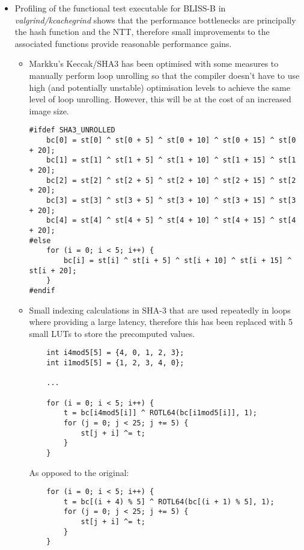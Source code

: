 \begin{itemize}
\item Profiling of the functional test executable for BLISS-B in \textit{valgrind/kcachegrind} shows that the performance bottlenecks are principally the hash function and the NTT, therefore small improvements to the associated functions provide reasonable performance gains.

\begin{itemize}

  \item Markku's Keccak/SHA3 has been optimised with some measures to manually perform loop unrolling so that the compiler doesn't have to use high (and potentially unstable) optimisation levels to achieve the same level of loop unrolling. However, this will be at the cost of an increased image size.

\begin{verbatim}
#ifdef SHA3_UNROLLED
    bc[0] = st[0] ^ st[0 + 5] ^ st[0 + 10] ^ st[0 + 15] ^ st[0 + 20];
    bc[1] = st[1] ^ st[1 + 5] ^ st[1 + 10] ^ st[1 + 15] ^ st[1 + 20];
    bc[2] = st[2] ^ st[2 + 5] ^ st[2 + 10] ^ st[2 + 15] ^ st[2 + 20];
    bc[3] = st[3] ^ st[3 + 5] ^ st[3 + 10] ^ st[3 + 15] ^ st[3 + 20];
    bc[4] = st[4] ^ st[4 + 5] ^ st[4 + 10] ^ st[4 + 15] ^ st[4 + 20];
#else
    for (i = 0; i < 5; i++) {
        bc[i] = st[i] ^ st[i + 5] ^ st[i + 10] ^ st[i + 15] ^ st[i + 20];
    }
#endif
\end{verbatim}

  \item Small indexing calculations in SHA-3 that are used repeatedly in loops where providing a large latency, therefore this has been replaced with 5 small LUTs to store the precomputed values.

\begin{verbatim}
    int i4mod5[5] = {4, 0, 1, 2, 3};
    int i1mod5[5] = {1, 2, 3, 4, 0};

    ...

    for (i = 0; i < 5; i++) {
        t = bc[i4mod5[i]] ^ ROTL64(bc[i1mod5[i]], 1);
        for (j = 0; j < 25; j += 5) {
            st[j + i] ^= t;
        }
    }
\end{verbatim}

As opposed to the original:

\begin{verbatim}
    for (i = 0; i < 5; i++) {
        t = bc[(i + 4) % 5] ^ ROTL64(bc[(i + 1) % 5], 1);
        for (j = 0; j < 25; j += 5) {
            st[j + i] ^= t;
        }
    }
\end{verbatim}
\end{itemize}
\end{itemize}



